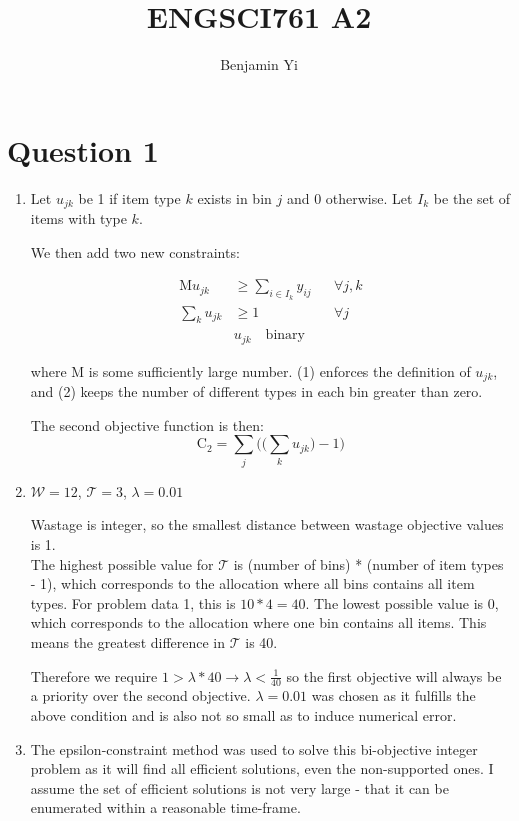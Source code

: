 \documentclass[10pt,a4paper]{article}
\begin{document}
\title{ENGSCI761 A2}
\author{Benjamin Yi}
	
\section*{Question 1}
\begin{enumerate}
\item
Let \(u_{jk}\) be 1 if item type \(k\) exists in bin \(j\) and 0 otherwise. Let \(I_k\) be the set of items with type \(k\).

We then add two new constraints:

\begin{align}
	\text{M}u_{jk} &\geq \sum_{i \in I_k} y_{ij} &&\forall j, k \\
	\sum_k u_{jk} & \geq 1 &&\forall j \\
	&u_{jk} \quad \text{binary}
\end{align}

where M is some sufficiently large number. (1) enforces the definition of \(u_{jk}\), and (2) keeps the number of different types in each bin greater than zero.

The second objective function is then:
\begin{equation*}
	\text{C}_2 = \sum_j \bigg(\bigg(\sum_k u_{jk}\bigg)-1\bigg)
\end{equation*}

\item 
\(\mathcal{W} = 12\), \(\mathcal{T} = 3\), \(\lambda = 0.01\)

Wastage is integer, so the smallest distance between wastage objective values is 1.\\
The highest possible value for \(\mathcal{T}\) is (number of bins) * (number of item types - 1), which corresponds to the allocation where all bins contains all item types. For problem data 1, this is \(10 * 4 = 40\). The lowest possible value is 0, which corresponds to the allocation where one bin contains all items. This means the greatest difference in \(\mathcal{T}\) is 40.

Therefore we require \(1 > \lambda * 40 \rightarrow \lambda < \frac{1}{40}\) so the first objective will always be a priority over the second objective. \(\lambda = 0.01\) was chosen as it fulfills the above condition and is also not so small as to induce numerical error.

\item 
The epsilon-constraint method was used to solve this bi-objective integer problem as it will find all efficient solutions, even the non-supported ones. I assume the set of efficient solutions is not very large - that it can be enumerated within a reasonable time-frame.


\end{enumerate}
\end{document}
